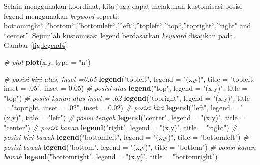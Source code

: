 \documentclass[]{book}
\newenvironment{Shaded}{\begin{snugshade}}{\end{snugshade}}
\newcommand{\CommentTok}[1]{\textcolor[rgb]{0.56,0.35,0.01}{\textit{#1}}}
\newcommand{\DataTypeTok}[1]{\textcolor[rgb]{0.13,0.29,0.53}{#1}}
\newcommand{\FloatTok}[1]{\textcolor[rgb]{0.00,0.00,0.81}{#1}}
\newcommand{\KeywordTok}[1]{\textcolor[rgb]{0.13,0.29,0.53}{\textbf{#1}}}
\newcommand{\NormalTok}[1]{#1}
\newcommand{\StringTok}[1]{\textcolor[rgb]{0.31,0.60,0.02}{#1}}
\theoremstyle{definition}
\theoremstyle{definition}
\theoremstyle{definition}
\theoremstyle{remark}
\begin{document}
Selain menggunakan koordinat, kita juga dapat melakukan kustomisasi posisi legend menggunakan \emph{keyword} seperti: bottomright``,''bottom``,''bottomleft``,''left``,''topleft``,''top``,''topright``,''right" and ``center''. Sejumlah kustomisasi legend berdasarkan \emph{keyword} disajikan pada Gambar \ref{fig:legend4}:

\begin{Shaded}
\begin{Highlighting}[]
\CommentTok{# plot}
\KeywordTok{plot}\NormalTok{(x,y, }\DataTypeTok{type =} \StringTok{"n"}\NormalTok{)}

\CommentTok{# posisi kiri atas, inset =0.05}
\KeywordTok{legend}\NormalTok{(}\StringTok{"topleft"}\NormalTok{,}
  \DataTypeTok{legend =} \StringTok{"(x,y)"}\NormalTok{,}
  \DataTypeTok{title =} \StringTok{"topleft, inset = .05"}\NormalTok{,}
  \DataTypeTok{inset =} \FloatTok{0.05}\NormalTok{)}
\CommentTok{# posisi atas}
\KeywordTok{legend}\NormalTok{(}\StringTok{"top"}\NormalTok{,}
       \DataTypeTok{legend =} \StringTok{"(x,y)"}\NormalTok{,}
       \DataTypeTok{title =} \StringTok{"top"}\NormalTok{)}
\CommentTok{# posisi kanan atas inset = .02}
\KeywordTok{legend}\NormalTok{(}\StringTok{"topright"}\NormalTok{,}
       \DataTypeTok{legend =} \StringTok{"(x,y)"}\NormalTok{,}
       \DataTypeTok{title =} \StringTok{"topright, inset = .02"}\NormalTok{,}
       \DataTypeTok{inset =} \FloatTok{0.02}\NormalTok{)}
\CommentTok{# posisi kiri}
\KeywordTok{legend}\NormalTok{(}\StringTok{"left"}\NormalTok{,}
       \DataTypeTok{legend =} \StringTok{"(x,y)"}\NormalTok{,}
       \DataTypeTok{title =} \StringTok{"left"}\NormalTok{)}
\CommentTok{# posisi tengah}
\KeywordTok{legend}\NormalTok{(}\StringTok{"center"}\NormalTok{,}
       \DataTypeTok{legend =} \StringTok{"(x,y)"}\NormalTok{,}
       \DataTypeTok{title =} \StringTok{"center"}\NormalTok{)}
\CommentTok{# posisi kanan}
\KeywordTok{legend}\NormalTok{(}\StringTok{"right"}\NormalTok{,}
       \DataTypeTok{legend =} \StringTok{"(x,y)"}\NormalTok{,}
       \DataTypeTok{title =} \StringTok{"right"}\NormalTok{)}
\CommentTok{# posisi kiri bawah}
\KeywordTok{legend}\NormalTok{(}\StringTok{"bottomleft"}\NormalTok{,}
       \DataTypeTok{legend =} \StringTok{"(x,y)"}\NormalTok{,}
       \DataTypeTok{title =} \StringTok{"bottomleft"}\NormalTok{)}
\CommentTok{# posisi bawah}
\KeywordTok{legend}\NormalTok{(}\StringTok{"bottom"}\NormalTok{,}
       \DataTypeTok{legend =} \StringTok{"(x,y)"}\NormalTok{,}
       \DataTypeTok{title =} \StringTok{"bottom"}\NormalTok{)}
\CommentTok{# posisi kanan bawah}
\KeywordTok{legend}\NormalTok{(}\StringTok{"bottomright"}\NormalTok{,}
       \DataTypeTok{legend =} \StringTok{"(x,y)"}\NormalTok{,}
       \DataTypeTok{title =} \StringTok{"bottomright"}\NormalTok{)}
\end{Highlighting}
\end{Shaded}
\end{document}
